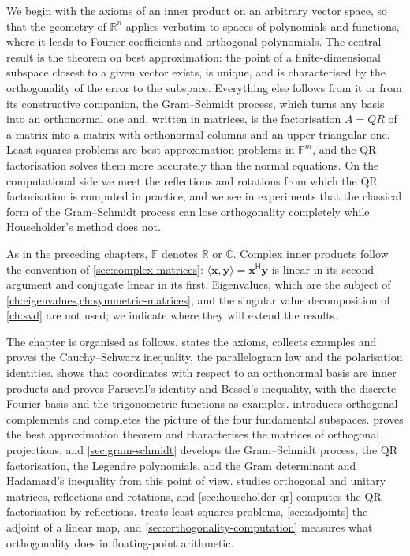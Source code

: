 We begin with the axioms of an inner product on an arbitrary vector space, so that the geometry of $\mathbb R^n$ applies verbatim to spaces of polynomials and functions, where it leads to Fourier coefficients and orthogonal polynomials. The central result is the theorem on best approximation: the point of a finite-dimensional subspace closest to a given vector exists, is unique, and is characterised by the orthogonality of the error to the subspace. Everything else follows from it or from its constructive companion, the Gram--Schmidt process, which turns any basis into an orthonormal one and, written in matrices, is the factorisation $A=QR$ of a matrix into a matrix with orthonormal columns and an upper triangular one. Least squares problems are best approximation problems in $\mathbb F^m$, and the QR factorisation solves them more accurately than the normal equations. On the computational side we meet the reflections and rotations from which the QR factorisation is computed in practice, and we see in experiments that the classical form of the Gram--Schmidt process can lose orthogonality completely while Householder's method does not.

As in the preceding chapters, $\mathbb F$ denotes $\mathbb R$ or $\mathbb C$. Complex inner products follow the convention of \cref{sec:complex-matrices}: $\langle\mathbf x,\mathbf y\rangle=\mathbf x^{\mathsf H}\mathbf y$ is linear in its second argument and conjugate linear in its first. Eigenvalues, which are the subject of \cref{ch:eigenvalues,ch:symmetric-matrices}, and the singular value decomposition of \cref{ch:svd} are not used; we indicate where they will extend the results.

The chapter is organised as follows.  states the axioms, collects examples and proves the Cauchy--Schwarz inequality, the parallelogram law and the polarisation identities.  shows that coordinates with respect to an orthonormal basis are inner products and proves Parseval's identity and Bessel's inequality, with the discrete Fourier basis and the trigonometric functions as examples.  introduces orthogonal complements and completes the picture of the four fundamental subspaces.  proves the best approximation theorem and characterises the matrices of orthogonal projections, and \cref{sec:gram-schmidt} develops the Gram--Schmidt process, the QR factorisation, the Legendre polynomials, and the Gram determinant and Hadamard's inequality from this point of view.  studies orthogonal and unitary matrices, reflections and rotations, and \cref{sec:householder-qr} computes the QR factorisation by reflections.  treats least squares problems, \cref{sec:adjoints} the adjoint of a linear map, and \cref{sec:orthogonality-computation} measures what orthogonality does in floating-point arithmetic.

